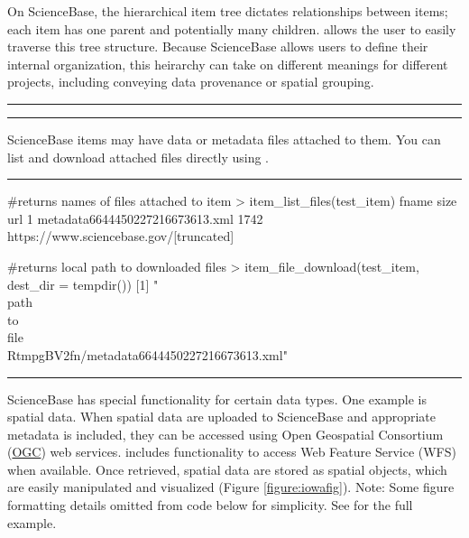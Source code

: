 On ScienceBase, the hierarchical item tree dictates relationships between items; 
each item has one parent and potentially many children.  allows the user to
easily traverse this tree structure. Because ScienceBase allows users to define their internal 
organization, this heirarchy can take on different meanings for different projects, including 
conveying data provenance or spatial grouping.


\noindent\rule{\textwidth}{0.4pt}
\noindent\rule{\textwidth}{0.4pt}

ScienceBase items may have data or metadata files attached to them.
You can list and download attached files directly using .

\noindent\rule{\textwidth}{0.4pt}
\begin{example}
#returns names of files attached to item
> item_list_files(test_item)
                              fname size  url
  1 metadata6644450227216673613.xml 1742  https://www.sciencebase.gov/[truncated]

#returns local path to downloaded files
> item_file_download(test_item, dest_dir = tempdir())
[1] "\\path\\to\\file\\RtmpgBV2fn/metadata6644450227216673613.xml"
\end{example}
\noindent\rule{\textwidth}{0.4pt}

ScienceBase has special functionality for certain data types.
One example is spatial data. When spatial data are uploaded to ScienceBase 
and appropriate metadata is included, they can be accessed using 
Open Geospatial Consortium (\href{http://www.opengeospatial.org/}{OGC}) 
web services.  includes functionality to access Web
Feature Service (WFS) when available. Once retrieved, spatial data are stored 
as  spatial objects, which are easily manipulated and visualized (Figure \ref{figure:iowafig}). 
Note: Some figure formatting details 
omitted from code below for simplicity. See 
for the full example.

